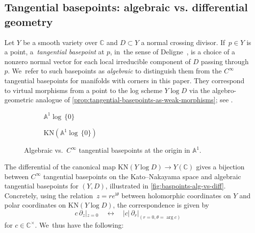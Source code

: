 \documentclass[10pt]{amsart}
\theoremstyle{definition}
\theoremstyle{remark}
\let\defn\emph
\newcommand{\CC}{\mathbb{C}}
\newcommand{\AF}{\mathbb{A}}
\newcommand{\logcyl}{\AF^1 \log\, \{0\}}
\newcommand{\iu}{\mathrm{i}}
\newcommand{\cvf}[1]{\partial_{#1}}
\newcommand{\KN}[1]{\mathrm{KN}(#1)}
\begin{document}
\subsection{Tangential basepoints: algebraic vs. differential geometry}
\label{sec:KN-basepoints}
Let $Y$ be a smooth variety over $\CC$ and $D \subset Y$ a normal crossing divisor. If~$p \in Y$ is a point, a~\defn{tangential basepoint} at $p$, in~the sense of Deligne~\cite[\S15]{Deligne1989}, is a choice of a nonzero normal vector for each local irreducible component of $D$ passing through $p$. We~refer to such basepoints as \defn{algebraic} to distinguish them from the $C^\infty$ tangential basepoints for manifolds with corners in this paper. They correspond to virtual morphisms from a point to the log scheme $Y\log D$ via the algebro-geometric analogue of \autoref{prop:tangential-basepoints-as-weak-morphisms}; see \cite{DPP:WeakMorphisms}.

\begin{figure}
\begin{subfigure}{0.4\textwidth}
\centering{}
\caption{$\logcyl$}
\end{subfigure}
\begin{subfigure}{0.4\textwidth}
\centering{}
\caption{$\KN{\logcyl}$}
\end{subfigure}
\caption{Algebraic vs.~$C^\infty$ tangential basepoints at the origin in $\AF^1$.}
\label{fig:baspoints-alg-vs-diff}
\end{figure}

The differential of the canonical map $\KN{Y\log D} \to Y(\CC)$ gives a bijection between $C^\infty$ tangential basepoints on the Kato--Nakayama space and algebraic tangential basepoints for $(Y,D)$, illustrated in \autoref{fig:baspoints-alg-vs-diff}. Concretely, using the relation~\hbox{$z \!=\! r e^{\iu \theta}$} between holomorphic coordinates on $Y$ and polar coordinates on $\KN{Y\log D}$, the correspondence is given by
\[
c\, \cvf{z}|_{z=0} \quad \longleftrightarrow \quad |c| \, \cvf{r}|_{(r=0,\theta=\arg c)}
\]
for $c\in \CC^\times$. We~thus have the following:
\end{document}
